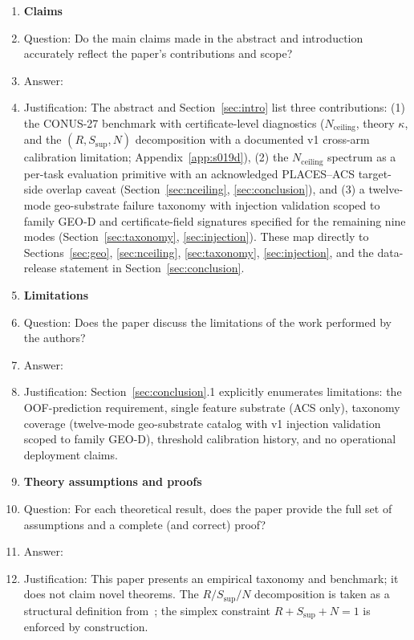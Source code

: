 \documentclass{article}
\begin{document}
\begin{enumerate}

\item {\bf Claims}
    \item[] Question: Do the main claims made in the abstract and introduction accurately reflect the paper's contributions and scope?
    \item[] Answer: \answerYes{}
    \item[] Justification: The abstract and Section~\ref{sec:intro} list three contributions: (1) the CONUS-27 benchmark with certificate-level diagnostics ($N_{\text{ceiling}}$, theory $\kappa$, and the $(R, S_{\text{sup}}, N)$ decomposition with a documented v1 cross-arm calibration limitation; Appendix~\ref{app:s019d}), (2) the $N_{\text{ceiling}}$ spectrum as a per-task evaluation primitive with an acknowledged PLACES--ACS target-side overlap caveat (Section~\ref{sec:nceiling}, \ref{sec:conclusion}), and (3) a twelve-mode geo-substrate failure taxonomy with injection validation scoped to family GEO-D and certificate-field signatures specified for the remaining nine modes (Section~\ref{sec:taxonomy}, \ref{sec:injection}). These map directly to Sections~\ref{sec:geo}, \ref{sec:nceiling}, \ref{sec:taxonomy}, \ref{sec:injection}, and the data-release statement in Section~\ref{sec:conclusion}.

\item {\bf Limitations}
    \item[] Question: Does the paper discuss the limitations of the work performed by the authors?
    \item[] Answer: \answerYes{}
    \item[] Justification: Section~\ref{sec:conclusion}.1 explicitly enumerates limitations: the OOF-prediction requirement, single feature substrate (ACS only), taxonomy coverage (twelve-mode geo-substrate catalog with v1 injection validation scoped to family GEO-D), threshold calibration history, and no operational deployment claims.

\item {\bf Theory assumptions and proofs}
    \item[] Question: For each theoretical result, does the paper provide the full set of assumptions and a complete (and correct) proof?
    \item[] Answer: \answerNA{}
    \item[] Justification: This paper presents an empirical taxonomy and benchmark; it does not claim novel theorems. The $R/S_{\text{sup}}/N$ decomposition is taken as a structural definition from~\citep{martin2026rsct}; the simplex constraint $R{+}S_{\text{sup}}{+}N{=}1$ is enforced by construction.


\end{enumerate}
\end{document}

